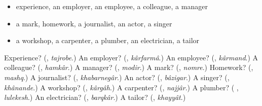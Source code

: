 \begin{itemize}
\raggedright
  \item experience, an employer, an employee, a colleague, a manager
  \item a mark, homework, a journalist, an actor, a singer
  \item a workshop, a carpenter, a plumber, an electrician, a tailor
\end{itemize}

\begin{tcolorbox}[breakable,colback=teal!4,colframe=teal!35!black,title={Before you move on}]
Experience? (\textbf{}, \emph{tajrobe}.) An employer? (\textbf{}, \emph{kârfarmâ}.) An employee? (\textbf{}, \emph{kârmand}.) A colleague? (\textbf{}, \emph{hamkâr}.) A manager? (\textbf{}, \emph{modir}.) A mark? (\textbf{}, \emph{nomre}.) Homework? (\textbf{}, \emph{mashq}.) A journalist? (\textbf{}, \emph{khabarnegâr}.) An actor? (\textbf{}, \emph{bâzigar}.) A singer? (\textbf{}, \emph{khânande}.) A workshop? (\textbf{}, \emph{kârgâh}.) A carpenter? (\textbf{}, \emph{najjâr}.) A plumber? (\textbf{ }, \emph{lulekesh}.) An electrician? (\textbf{}, \emph{barqkâr}.) A tailor? (\textbf{}, \emph{khayyât}.)
\end{tcolorbox}

